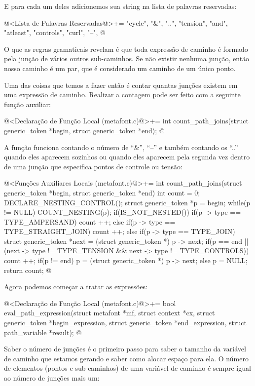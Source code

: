 E para cada um deles adicionemos sua string na lista de palavras
reservadas:

\iniciocodigo
@<Lista de Palavras Reservadas@>+=
"cycle", "&", "..", "tension", "and", "atleast", "controls", "curl", "--",
@
\fimcodigo

O que as regras gramaticais revelam é que toda expressão de caminho é
formado pela junção de vários outros sub-caminhos. Se não existir
nenhuma junção, então nosso caminho é um par, que é considerado um
caminho de um único ponto.

Uma das coisas que temos a fazer então é contar quantas junções
existem em uma expressão de caminho. Realizar a contagem pode ser
feito com a seguinte função auxiliar:

\iniciocodigo
@<Declaração de Função Local (metafont.c)@>+=
int count_path_joins(struct generic_token *begin, struct generic_token *end);
@
\fimcodigo

A função funciona contando o número de ``\&'', ``--'' e também contando os
``..'' quando eles aparecem sozinhos ou quando eles aparecem pela
segunda vez dentro de uma junção que especifica pontos de controle ou
tensão:

\iniciocodigo
@<Funções Auxiliares Locais (metafont.c)@>+=
int count_path_joins(struct generic_token *begin, struct generic_token *end){
  int count = 0;
  DECLARE_NESTING_CONTROL();
  struct generic_token *p = begin;
  while(p != NULL){
    COUNT_NESTING(p);
    if(IS_NOT_NESTED()){
      if(p -> type == TYPE_AMPERSAND)
        count ++;
      else if(p -> type == TYPE_STRAIGHT_JOIN)
        count ++;
      else if(p -> type == TYPE_JOIN){
        struct generic_token *next = (struct generic_token *) p -> next;
        if(p == end || (next -> type !=  TYPE_TENSION &&
                        next -> type != TYPE_CONTROLS))
          count ++;
      }
    }
    if(p != end)
      p = (struct generic_token *) p -> next;
    else
      p = NULL;
  }
  return count;
}
@
\fimcodigo

Agora podemos começar a tratar as expressões:

\iniciocodigo
@<Declaração de Função Local (metafont.c)@>+=
bool eval_path_expression(struct metafont *mf, struct context *cx,
                          struct generic_token *begin_expression,
                          struct generic_token *end_expression,
                          struct path_variable *result);
@
\fimcodigo


Saber o número de junções é o primeiro passo para saber o tamanho da
variável de caminho que estamos gerando e saber como alocar espaço
para ela. O número de elementos (pontos e sub-caminhos) de uma
variável de caminho é sempre igual ao número de junções mais um:

